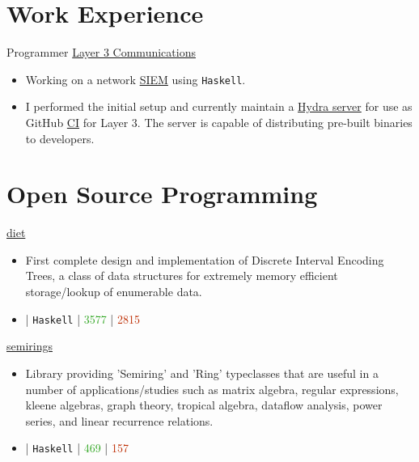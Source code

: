\documentclass[10pt,letterpaper,sans]{moderncv}
\newcommand{\wlink}[2]{\textcolor[HTML]{0020B6}{\href{#1}{#2}}}
\newcommand{\ghlink}[2]{\wlink{https://github.com/#1}{#2}}
\newcommand{\ghrepo}[1]{\ghlink{#1}{\faGithub}}
\newcommand{\ghlang}[1]{\texttt{#1}}
\newcommand{\ghadd}[1]{\textcolor[HTML]{30A622}{{\faPlusCircle} #1}}
\newcommand{\ghrem}[1]{\textcolor[HTML]{BD2C00}{{\faMinusCircle} #1}}
\newcommand{\ghub}[4]{\ghrepo{#2} | \ghlang{#1} | \ghadd{#3} | \ghrem{#4}}
\newcommand{\lang}[1]{\texttt{#1}}
\begin{document}
\makecvtitle{}


\section{Work Experience}
        {Programmer}
        {\wlink{https://www.layer3com.com}{Layer 3 Communications}}
        {}{}
        {
\begin{itemize}
  \item Working on a network \wlink{https://en.wikipedia.org/wiki/Security_information_and_event_management}{SIEM} using \lang{Haskell}.
\item I performed the initial setup and currently maintain a \wlink{https://github.com/NixOS/hydra}{Hydra server} for use as GitHub \wlink{https://en.wikipedia.org/wiki/Continuous_integration}{CI} for Layer 3. The server is capable of distributing pre-built binaries to developers.
\end{itemize}
}


\section{Open Source Programming}
\cventry{}
        {\wlink{https://github.com/chessai/diet}{diet}}
        {}{}{}
        {
\begin{itemize}
\item First complete design and implementation of Discrete Interval Encoding Trees, a class of data structures for extremely memory efficient storage/lookup of enumerable data.
\item \ghub{Haskell}{chessai/diet}{3577}{2815}
\end{itemize}
}

\cventry{}
        {\wlink{https://github.com/chessai/semirings}{semirings}}
        {}{}{}
        {
\begin{itemize}
\item Library providing 'Semiring' and 'Ring' typeclasses that are useful in a number of applications/studies such as matrix algebra, regular expressions, kleene algebras, graph theory, tropical algebra, dataflow analysis, power series, and linear recurrence relations.
\item \ghub{Haskell}{chessai/semirings}{469}{157}
\end{itemize}
}
\end{document}
